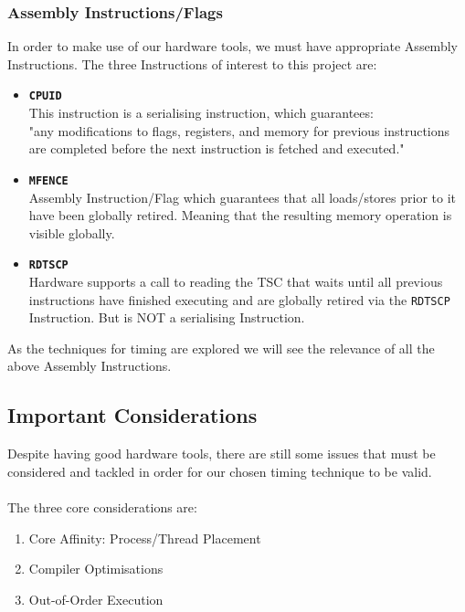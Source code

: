 \documentclass[bsc,frontabs,twoside,singlespacing,parskip,deptreport]{infthesis}     %
\begin{document}
\subsubsection{Assembly Instructions/Flags}
In order to make use of our hardware tools, we must have appropriate Assembly Instructions. The three Instructions of interest to this project are:
\begin{itemize}
    \item{
        {\bf \texttt{CPUID}\cite{cpuid_spec}} \\
        This instruction is a serialising instruction, which guarantees: \\
        "any modifications to flags, registers, and memory for previous instructions are completed before the next instruction is fetched and executed."
    }
    \item{
        {\bf \texttt{MFENCE}\cite{mfence_spec}} \\
        Assembly Instruction/Flag which guarantees that all loads/stores prior to it have been globally retired. Meaning that the resulting memory operation is visible globally.
    }
    \item{{\bf \texttt{RDTSCP}\cite{rdtscp_spec}} \\
    Hardware supports a call to reading the TSC that waits until all previous instructions have finished executing and are globally retired via the \texttt{RDTSCP} Instruction. But is NOT a serialising Instruction.}
\end{itemize}
As the techniques for timing are explored we will see the relevance of all the above Assembly Instructions.

\subsection{Important Considerations}
Despite having good hardware tools, there are still some issues that must be considered and tackled in order for our chosen timing technique to be valid. \\
\\
The three core considerations are:
\begin{enumerate}
    \item Core Affinity: Process/Thread Placement
    \item Compiler Optimisations
    \item Out-of-Order Execution
\end{enumerate}
\end{document}
